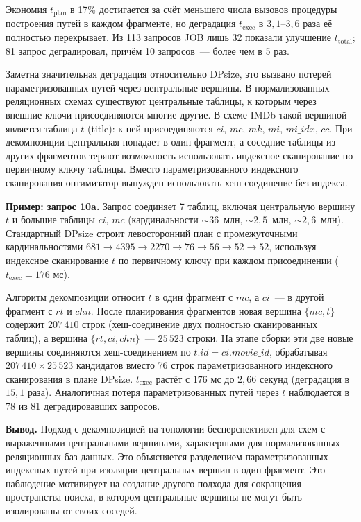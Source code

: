 Экономия $t_{\mathrm{plan}}$ в 17\% достигается за счёт меньшего числа вызовов
процедуры построения путей в каждом фрагменте, но деградация
$t_{\mathrm{exec}}$ в $3{,}1$--$3{,}6$ раза её полностью перекрывает.
Из 113 запросов JOB лишь 32 показали улучшение $t_{\mathrm{total}}$;
81 запрос деградировал, причём 10 запросов~--- более чем в 5 раз.
\par

Заметна значительная деградация относительно DPsize, это вызвано потерей параметризованных путей через 
центральные вершины.
В нормализованных реляционных схемах существуют центральные таблицы,
к которым через внешние ключи присоединяются многие другие.
В схеме IMDb такой вершиной является таблица $t$ (title):
к ней присоединяются $ci$, $mc$, $mk$, $mi$, $mi\_idx$, $cc$.
При декомпозиции центральная попадает в один фрагмент, а соседние таблицы
из других фрагментов теряют возможность использовать индексное сканирование
по первичному ключу таблицы.
Вместо параметризованного индексного сканирования 
оптимизатор вынужден использовать хеш-соединение без индекса.
\par

\textbf{Пример: запрос 10a.}
Запрос соединяет 7 таблиц, включая центральную вершину $t$ и большие таблицы
$ci$, $mc$ (кардинальности ${\sim}36$~млн, ${\sim}2{,}5$~млн, ${\sim}2{,}6$~млн).
Стандартный DPsize строит левосторонний план с промежуточными
кардинальностями $681 \to 4395 \to 2270 \to 76 \to 56 \to 52 \to 52$,
используя индексное сканирование $t$ по первичному ключу при каждом
присоединении ($t_{\mathrm{exec}} = 176$ мс).
\par

Алгоритм декомпозиции относит $t$ в один фрагмент с $mc$, а $ci$~---
в другой фрагмент с $rt$ и $chn$. После планирования фрагментов 
новая вершина $\{mc, t\}$ содержит $207\,410$ строк (хеш-соединение
двух полностью сканированных таблиц), а вершина $\{rt, ci, chn\}$~---
$25\,523$ строки. На этапе сборки эти две новые вершины соединяются
хеш-соединением по $t.\mathit{id} = ci.\mathit{movie\_id}$,
обрабатывая $207\,410 \times 25\,523$ кандидатов вместо 76 строк
параметризованного индексного сканирования в плане DPsize.
$t_{\mathrm{exec}}$ растёт с $176$ мс до $2{,}66$ секунд (деградация в $15{,}1$ раза).
Аналогичная потеря параметризованных путей через $t$ наблюдается в 78 из 81
деградировавших запросов.
\par

\textbf{Вывод.}
Подход с декомпозицией на топологии бесперспективен для схем с выраженными
центральными вершинами, характерными для нормализованных реляционных баз данных.
Это объясняется разделением параметризованных индексных путей при
изоляции центральных вершин в один фрагмент.
Это наблюдение мотивирует на создание другого подхода для сокращения пространства
поиска, в котором центральные вершины не могут быть изолированы от своих соседей.



